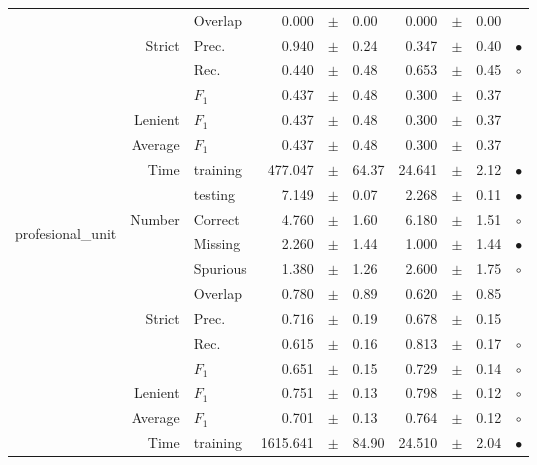 \begin{longtable}{|r|r|l||rcl|rcl|c|}
\cline{3-10}
  &  &  Overlap  & 0.000 &  $\pm$  & 0.00 & 0.000 &  $\pm$  & 0.00 &   \\
\cline{2-10}
  & \multirow{3}{*}{Strict} &  Prec.  & 0.940 &  $\pm$  & 0.24 & 0.347 &  $\pm$  & 0.40 &  $\bullet$\\
\cline{3-10}
  &  &  Rec.  & 0.440 &  $\pm$  & 0.48 & 0.653 &  $\pm$  & 0.45 &  $\circ$\\
\cline{3-10}
  &  &  $F_1$  & 0.437 &  $\pm$  & 0.48 & 0.300 &  $\pm$  & 0.37 &   \\
\cline{2-10}
  & Lenient &  $F_1$  & 0.437 &  $\pm$  & 0.48 & 0.300 &  $\pm$  & 0.37 &   \\
\cline{2-10}
  & Average &  $F_1$  & 0.437 &  $\pm$  & 0.48 & 0.300 &  $\pm$  & 0.37 &   \\
\cline{2-10}
  & \multirow{2}{*}{Time} &  training  & 477.047 &  $\pm$  & 64.37 & 24.641 &  $\pm$  & 2.12 &  $\bullet$\\
\cline{3-10}
  &  &  testing  & 7.149 &  $\pm$  & 0.07 & 2.268 &  $\pm$  & 0.11 &  $\bullet$\\
\hline
\hline
\multirow{11}{*}{\begin{sideways}profesional\_unit\end{sideways} } & \multirow{4}{*}{Number} &  Correct  & 4.760 &  $\pm$  & 1.60 & 6.180 &  $\pm$  & 1.51 &  $\circ$\\
\cline{3-10}
  &  &  Missing  & 2.260 &  $\pm$  & 1.44 & 1.000 &  $\pm$  & 1.44 &  $\bullet$\\
\cline{3-10}
  &  &  Spurious  & 1.380 &  $\pm$  & 1.26 & 2.600 &  $\pm$  & 1.75 &  $\circ$\\
\cline{3-10}
  &  &  Overlap  & 0.780 &  $\pm$  & 0.89 & 0.620 &  $\pm$  & 0.85 &   \\
\cline{2-10}
  & \multirow{3}{*}{Strict} &  Prec.  & 0.716 &  $\pm$  & 0.19 & 0.678 &  $\pm$  & 0.15 &   \\
\cline{3-10}
  &  &  Rec.  & 0.615 &  $\pm$  & 0.16 & 0.813 &  $\pm$  & 0.17 &  $\circ$\\
\cline{3-10}
  &  &  $F_1$  & 0.651 &  $\pm$  & 0.15 & 0.729 &  $\pm$  & 0.14 &  $\circ$\\
\cline{2-10}
  & Lenient &  $F_1$  & 0.751 &  $\pm$  & 0.13 & 0.798 &  $\pm$  & 0.12 &  $\circ$\\
\cline{2-10}
  & Average &  $F_1$  & 0.701 &  $\pm$  & 0.13 & 0.764 &  $\pm$  & 0.12 &  $\circ$\\
\cline{2-10}
  & \multirow{2}{*}{Time} &  training  & 1615.641 &  $\pm$  & 84.90 & 24.510 &  $\pm$  & 2.04 &  $\bullet$\\

\end{longtable}
